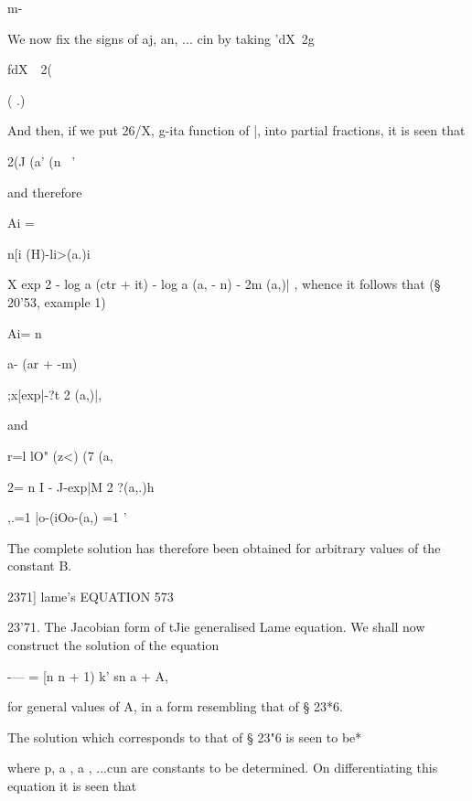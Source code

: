 {{{{{{{{m- 



We now fix the signs of aj, an, ... cin by taking 
'dX\ 2g 



fdX\ \  2( 



( .) 



And then, if we put 26/X, g-ita function of |, into partial fractions, it is seen 
that 



2(J   (a' (n \ '  



and therefore 



Ai = 



n[i (H)-li>(a.)i 



X exp 2 -  log a (ctr + it) - log a (a, - n) - 2m   (a,)| , 
whence it follows that (§ 20'53, example 1) 



Ai= n 



a- (ar + -m) 



;x[exp|-?t 2 (a,)|, 



and 



r=l lO" (z<) (7 (a, 

 2= n I - J-exp|M 2 ?(a,.)h 

,.=1 |o-(iOo-(a,)  =1 '  



The complete solution has therefore been obtained for arbitrary values of the 
constant B. 



2371] lame's EQUATION 573 

23'71. The Jacobian form of tJie generalised Lame equation. 
We shall now construct the solution of the equation 

-— = [n  n + 1) k' sn  a +     A, 

for general values of A, in a form resembling that of § 23*6. 

The solution which corresponds to that of § 23"6 is seen to be* 






where p, a , a , ...cun are constants to be determined. 
On differentiating this equation it is seen that 

}}}}}}}}
